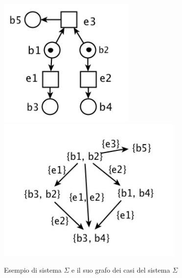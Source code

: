 \begin{figure}
  \centering
  \includegraphics[scale = 0.5]{img/seq1.jpg}
  \includegraphics[scale = 0.5]{img/seq2.jpg}
  \caption{Esempio di sistema $\Sigma$ e il suo grafo dei casi del sistema
    $\Sigma$}
  \label{fig:gra}
\end{figure}
